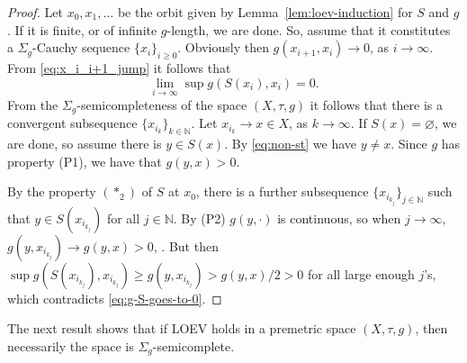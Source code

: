 \documentclass[12pt]{article}
\newcommand{\astwo}{(\ast_2)}
\newcommand{\N}{\mathbb{N}}
\renewcommand{\emptyset}{\varnothing}
\begin{document}
\begin{proof}
Let $x_0,x_1,\dots$ be the orbit given by Lemma~\ref{lem:loev-induction} for $S$ and $g$. If it is finite, or of infinite $g$-length, we are done. So, assume that it constitutes a $\Sigma_g$-Cauchy sequence $\{x_i\}_{i \geq 0}$. Obviously then $g(x_{i+1},x_i) \to 0$, as $i\to\infty$.  From \eqref{eq:x_i_i+1_jump} it follows that
\begin{equation}
    \label{eq:g-S-goes-to-0}
    \lim_{i\to\infty}\sup g(S(x_i),x_i) = 0.
\end{equation}
 From the  $\Sigma_g$-semicompleteness of the space $(X,\tau,g)$ it follows that  there is a convergent subsequence $\{x_{i_k}\}_{k\in\mathbb{N}}$. Let  $x_{i_k} \rightarrow  x\in X$, as $k \rightarrow \infty$. If $S(x) = \emptyset$, we are done, so assume there is $y \in S({x })$. By \eqref{eq:non-st} we have $y\neq x$. Since  $g$ has property (P1), we have that $g(y,x)>0$.

 By the property $\astwo$ of $S$ at $x_0$, there is a further subsequence $\{x_{i_{k_j}}\}_{j\in\mathbb{N}}$ such that  $y \in S(x_{i_{k_j}})$ for all $j\in \N$. By (P2) $g(y,\cdot)$ is continuous, so when $j \rightarrow \infty$, $g(y, x_{i_{k_j}}) \rightarrow g(y, x)>0$, . But then $\sup g(S(x_{i_{k_j}}),x_{i_{k_j}}) \ge g(y, x_{i_{k_j}}) > g(y, x)/2 > 0$ for all large enough $j$'s, which contradicts \eqref{eq:g-S-goes-to-0}.
\end{proof}



The next result shows that if LOEV holds  in a premetric space $(X,\tau,g)$, then necessarily the space is  $\Sigma_g$-semicomplete.
\end{document}
